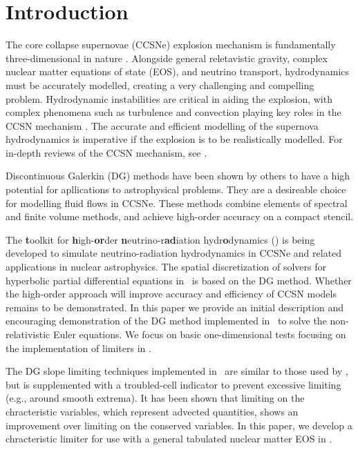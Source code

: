 \documentclass[onecolumn]{aastex62}
\begin{document}
\section{Introduction}
\label{sec:Intro}
The core collapse supernovae (CCSNe) explosion mechanism is fundamentally three-dimensional
in nature \citep[see e.g.,][]{blondin:2006, muller:2012, oconnor:2018b}. Alongside general
reletavistic gravity, complex nuclear matter equations of state (EOS), and
neutrino transport, hydrodynamics must be accurately modelled,
creating a very challenging and compelling problem. Hydrodynamic instabilities are critical
in aiding the explosion, with complex phenomena such as turbulence and
convection playing key roles in the CCSN mechanism
\citep{murphy:2011, murphy:2013, couch:2013, couch:2015a, radice:2016, mabanta:2018}.
The accurate and efficient modelling of the supernova hydrodynamics is imperative if the
explosion is to be realistically modelled.
For in-depth reviews of the CCSN mechanism, see
\citet{bethe:1990, janka:2007, janka:2012a, janka:2016, burrows:2013, hix:2014, muller:2016, couch:2017}.

Discontinuous Galerkin (DG) methods have been shown by others
\citep[see e.g.,][]{radice:2011, schaal:2015a, zanotti:2015, dumbser:2018} to have a
high potential for apllications to astrophysical problems. They are a desireable
choice for modelling fluid flows in CCSNe. These methods combine elements of
spectral and finite volume methods, and achieve high-order accuracy
on a compact stencil.

The {\bf t}oolkit for {\bf h}igh-{\bf or}der {\bf n}eutrino-r{\bf ad}iation hydr{\bf o}dynamics (\thornado) is being developed to simulate neutrino-radiation hydrodynamics in CCSNe and related applications in nuclear astrophysics.
The spatial discretization of solvers for hyperbolic partial differential equations in \thornado\, is based on the DG method.
Whether the high-order approach will improve accuracy and efficiency of CCSN models remains to be demonstrated.
In this paper we provide an initial description and encouraging demonstration
of the DG method implemented in \thornado\, to solve the non-relativistic Euler equations.
We focus on basic one-dimensional tests focusing on the implementation of limiters in \thornado.

The DG slope limiting techniques implemented in \thornado\, are similar to those
used by \cite{schaal:2015a}, but is supplemented with a troubled-cell
indicator \cite{fu:2017} to prevent excessive limiting (e.g., around smooth extrema).
It has been shown \citep[see e.g.,][]{schaal:2015a, cockburn:1998, cockburn:1989}
that limiting on the chracteristic variables, which represent advected quantities,
shows an improvement over limiting on the conserved variables.
In this paper, we develop a chracteristic limiter for use with a general tabulated
nuclear matter EOS in \thornado.
\end{document}
